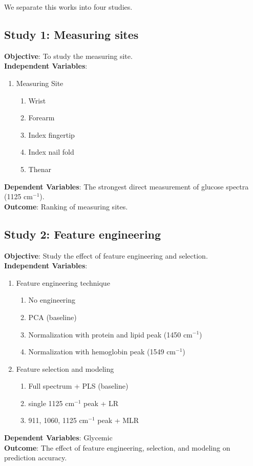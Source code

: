 We separate this works into four studies.

\subsection{Study 1: Measuring sites}

\textbf{Objective}: To study the measuring site.\\
\textbf{Independent Variables}: 
\begin{enumerate}
    \item Measuring Site
    \begin{enumerate}
        \item Wrist
        \item Forearm
        \item Index fingertip
        \item Index nail fold
        \item Thenar
    \end{enumerate}
\end{enumerate}

\begin{sloppypar}
    \textbf{Dependent Variables}: The strongest direct measurement of glucose spectra (1125 $\text{cm}^{-1}$).\\
    \textbf{Outcome}: Ranking of measuring sites.
\end{sloppypar}


\subsection{Study 2: Feature engineering}\label{intro-s2}

\textbf{Objective}: Study the effect of feature engineering and selection.\\
\textbf{Independent Variables}:
\begin{enumerate}
    \item Feature engineering technique
    \begin{enumerate}
        \item No engineering
        \item PCA (baseline)
        \item Normalization with protein and lipid peak (1450 $\text{cm}^{-1}$)
        \item Normalization with hemoglobin peak (1549 $\text{cm}^{-1}$)
    \end{enumerate}
    \item Feature selection and modeling
    \begin{enumerate}
        \item Full spectrum + PLS (baseline)
        \item single 1125 $\text{cm}^{-1}$ peak + LR
        \item 911, 1060, 1125 $\text{cm}^{-1}$ peak + MLR
    \end{enumerate}
\end{enumerate}
\textbf{Dependent Variables}: Glycemic\\
\textbf{Outcome}: The effect of feature engineering, selection, and modeling on prediction accuracy.

